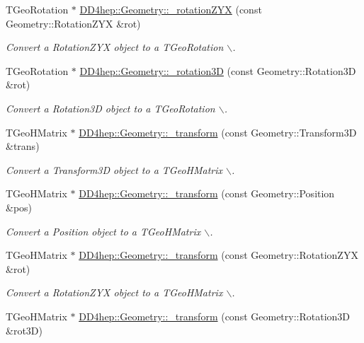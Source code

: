 \begin{DoxyCompactItemize}
TGeoRotation $\ast$ \hyperlink{group___d_d4_h_e_p___g_e_o_m_e_t_r_y_gac468c0a81631e0a1c052094131f9d680}{DD4hep::Geometry::\_\-rotationZYX} (const Geometry::RotationZYX \&rot)
\begin{DoxyCompactList}\small\item\em Convert a RotationZYX object to a TGeoRotation $\backslash$. \item\end{DoxyCompactList}\item 
TGeoRotation $\ast$ \hyperlink{group___d_d4_h_e_p___g_e_o_m_e_t_r_y_ga1dc4cc8b92d11d2fc874ed142c7b1bbc}{DD4hep::Geometry::\_\-rotation3D} (const Geometry::Rotation3D \&rot)
\begin{DoxyCompactList}\small\item\em Convert a Rotation3D object to a TGeoRotation $\backslash$. \item\end{DoxyCompactList}\item 
TGeoHMatrix $\ast$ \hyperlink{group___d_d4_h_e_p___g_e_o_m_e_t_r_y_ga01d65a905944a17404358ea0116d4dd3}{DD4hep::Geometry::\_\-transform} (const Geometry::Transform3D \&trans)
\begin{DoxyCompactList}\small\item\em Convert a Transform3D object to a TGeoHMatrix $\backslash$. \item\end{DoxyCompactList}\item 
TGeoHMatrix $\ast$ \hyperlink{group___d_d4_h_e_p___g_e_o_m_e_t_r_y_ga543149f9fccc6961eb19ab307f96e192}{DD4hep::Geometry::\_\-transform} (const Geometry::Position \&pos)
\begin{DoxyCompactList}\small\item\em Convert a Position object to a TGeoHMatrix $\backslash$. \item\end{DoxyCompactList}\item 
TGeoHMatrix $\ast$ \hyperlink{group___d_d4_h_e_p___g_e_o_m_e_t_r_y_gaf3a07560a5302fbb20eed5a933e611d8}{DD4hep::Geometry::\_\-transform} (const Geometry::RotationZYX \&rot)
\begin{DoxyCompactList}\small\item\em Convert a RotationZYX object to a TGeoHMatrix $\backslash$. \item\end{DoxyCompactList}\item 
TGeoHMatrix $\ast$ \hyperlink{group___d_d4_h_e_p___g_e_o_m_e_t_r_y_ga2b988c5fb8e427e757080009b3a4856f}{DD4hep::Geometry::\_\-transform} (const Geometry::Rotation3D \&rot3D)

\end{DoxyCompactItemize}
